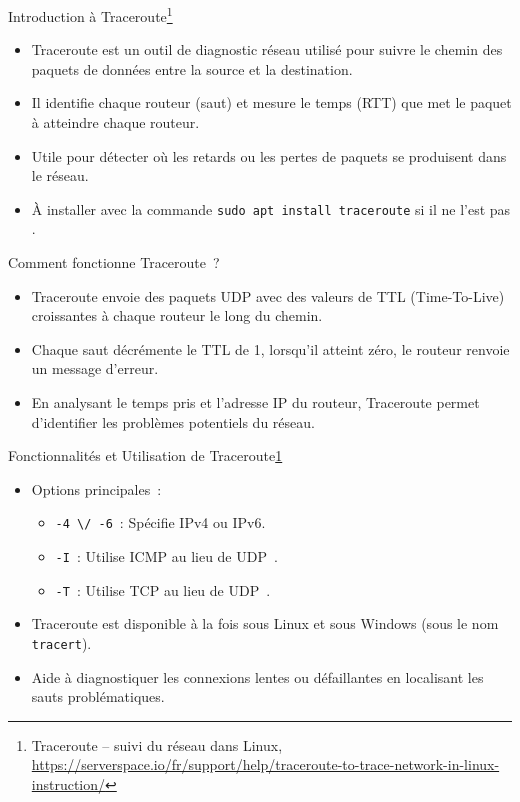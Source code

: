 \documentclass{beamer}
\begin{document}
    \begin{frame}{Introduction à Traceroute\footnote{\label{traceroute}Traceroute – suivi du réseau dans Linux, \url{https://serverspace.io/fr/support/help/traceroute-to-trace-network-in-linux-instruction/}}}
        \begin{itemize}
            \item Traceroute est un outil de diagnostic réseau utilisé pour suivre le chemin des paquets de données entre la source et la destination.
            \item Il identifie chaque routeur (saut) et mesure le temps (RTT) que met le paquet à atteindre chaque routeur.
            \item Utile pour détecter où les retards ou les pertes de paquets se produisent dans le réseau.
            \item À installer avec la commande \lstinline{sudo apt install traceroute} si il ne l'est pas .
        \end{itemize}
        \bigbreak
        Comment fonctionne Traceroute~?
        \begin{itemize}
            \item Traceroute envoie des paquets UDP avec des valeurs de TTL (Time-To-Live) croissantes à chaque routeur le long du chemin.
            \item Chaque saut décrémente le TTL de 1, lorsqu'il atteint zéro, le routeur renvoie un message d'erreur.
            \item En analysant le temps pris et l'adresse IP du routeur, Traceroute permet d'identifier les problèmes potentiels du réseau.
        \end{itemize}
    \end{frame}

    \begin{frame}{Fonctionnalités et Utilisation de Traceroute\cref{traceroute}}
        \begin{small}
            \begin{itemize}
                \item Options principales~:
                \begin{itemize}
                    \item \lstinline{-4 \/ -6}~: Spécifie IPv4 ou IPv6.
                    \item \lstinline{-I}~: Utilise ICMP au lieu de UDP~.
                    \item \lstinline{-T}~: Utilise TCP au lieu de UDP~.
                \end{itemize}
                \item Traceroute est disponible à la fois sous Linux et sous Windows (sous le nom \lstinline{tracert}).
                \item Aide à diagnostiquer les connexions lentes ou défaillantes en localisant les sauts problématiques.
            \end{itemize}
        \end{small}
    \end{frame}
\end{document}
